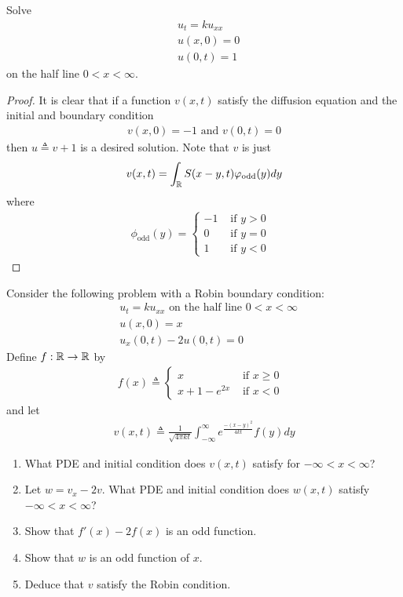 \documentclass{report}
\begin{document}
\begin{question}{}{}
Solve 
\begin{align*}
&u_t=ku_{xx}\\
&u(x,0)=0 \\
&u(0,t)=1
\end{align*}
on the half line $0<x<\infty$. 
\end{question}
\begin{proof}
It is clear that if a function $v(x,t)$ satisfy the diffusion equation and the initial and boundary condition 
\begin{align*}
v(x,0)=-1\text{ and }v(0,t)=0
\end{align*}
then $u\triangleq v+1$ is a desired solution. Note that $v$ is just 
\begin{align*}
v(x,t)=\int_{\mathbb{R}}S(x-y,t)\varphi_{\operatorname{odd}} (y)dy
\end{align*}
where 
\begin{align*}
\phi_{\operatorname{odd}}(y)=\begin{cases}
 -1& \text{ if $y>0$ }\\
 0& \text{ if $y=0$ }\\
 1& \text{ if $y<0$ } 
\end{cases}
\end{align*}
\end{proof}
\begin{question}{}{}
Consider the following problem with a Robin boundary condition: 
\begin{align*}
&u_t=ku_{xx}\text{ on the half line }0<x<\infty \\
&u(x,0)=x\\
&u_x(0,t)-2u(0,t)=0
\end{align*}
Define $f:\mathbb{R}\rightarrow \mathbb{R}$ by
\begin{align*}
f(x)\triangleq \begin{cases}
  x& \text{ if $x\geq 0$ }\\
  x+1-e^{2x}& \text{ if $x<0$ }
\end{cases}
\end{align*}
and let 
\begin{align*}
v(x,t)\triangleq  \frac{1}{\sqrt{4 \pi kt}} \int_{-\infty}^{\infty} e^{\frac{-(x-y)^2}{4kt}}f(y)dy 
\end{align*}
\begin{enumerate}[label=(\alph*)]
  \item What PDE and initial condition does $v(x,t)$ satisfy for $-\infty < x< \infty$? 
  \item Let $w=v_x-2v$. What PDE and initial condition does  $w(x,t)$ satisfy $-\infty < x< \infty$? 
  \item Show that $f'(x)-2f(x)$ is an odd function. 
  \item Show that $w$ is an odd function of $x$.  
  \item Deduce that $v$ satisfy the Robin condition. 
\end{enumerate}
\end{question}
\end{document}
